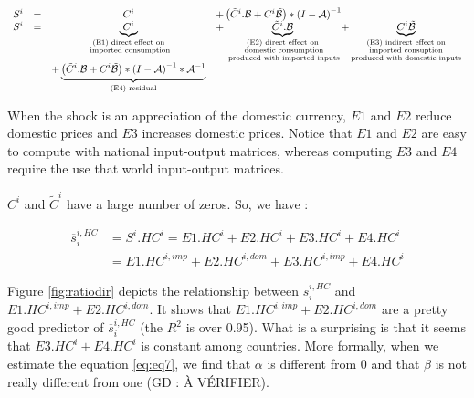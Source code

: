 \documentclass[11pt,a4paper]{article}
\begin{document}
\begin{equation}
\begin{array}{lccl}
	S^ i&=&C^i	&+ \left(\tilde{C}^i.{\cal B}+{C^i}{\tilde{{\cal B}}}\right)*{{(I-{\cal A})}^{-1}} \\
	S^i &=&\underbrace{C^i}_{\substack{\text{(E1) direct effect on} \\ \text{ imported consumption}}}&+ \underbrace{\tilde{C}^i.{\cal B}}_{\substack{\text{(E2) direct effect on} \\ \text{ domestic consumption} \\ \text{ produced with  imported inputs}}}  + \underbrace{{C^i}{\tilde{{\cal B}}}}_{\substack{\text{(E3) indirect effect on} \\ \text{imported consuption} \\ \text{produced with domestic inputs}}} \\ &&+\underbrace {\left( \tilde{C}^i.{\cal B} + {C^i}{\tilde{{\cal B}}}\right)*{{(I-{\cal A})}^{-1}}*{\cal A}^{-1}}_{\text{(E4) residual}} \\
\end{array}
\end{equation}

When the shock is an appreciation of the domestic currency, $E1$ and $E2$ reduce domestic prices and $E3$ increases domestic prices. Notice that $E1$ and $E2$ are easy to compute with national input-output matrices, whereas computing $E3$ and $E4$ require the use that world input-output matrices.

$C^i$ and $\tilde{C}^i$ have a large number of zeros. So, we have :

\begin{equation}
\begin{array}{lccl}
\overline{s}_{i}^{i,HC}&=S^i.HC^i=E1.HC^i+E2.HC^i+E3.HC^i+E4.HC^i \\
&=E1.HC^{i,imp}+E2.HC^{i,dom}+E3.HC^{i,imp}+E4.HC^i
 \end{array} 
 \end{equation}

 
Figure \ref{fig:ratiodir} depicts the relationship between $\overline{s}_{i}^{i,HC}$ and $E1.HC^{i,imp}+E2.HC^{i,dom}$. It shows that $E1.HC^{i,imp}+E2.HC^{i,dom}$ are a pretty good predictor of $\overline{s}_{i}^{i,HC}$ (the $R^2$ is over 0.95). What is a surprising is that it seems that $E3.HC^i+E4.HC^i$ is constant among countries. 
More formally, when we estimate the  equation \ref{eq:eq7}, we find that $\alpha$ is different from 0 and that $\beta$ is not really different from one (GD : À VÉRIFIER).
\end{document}
